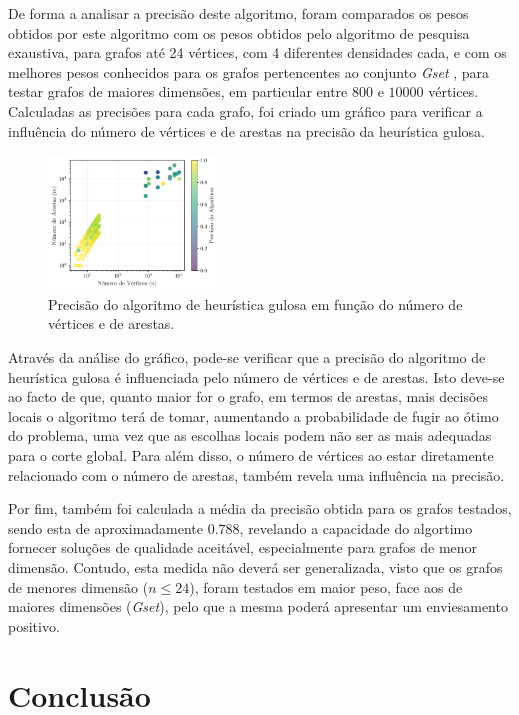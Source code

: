 \documentclass[mirror]{revdetua}
\begin{document}
De forma a analisar a precisão deste algoritmo, foram comparados os pesos obtidos por este algoritmo com os pesos obtidos pelo algoritmo de pesquisa exaustiva, para grafos até 24 vértices, com 4 diferentes densidades cada, e com os melhores pesos conhecidos para os grafos pertencentes ao conjunto \textit{Gset} \cite{GS24, ME19}, para testar grafos de maiores dimensões, em particular entre $800$ e $10000$ vértices. Calculadas as precisões para cada grafo, foi criado um gráfico para verificar a influência do número de vértices e de arestas na precisão da heurística gulosa.

\begin{figure}[h]
    \centering
    \includegraphics[width=0.4\textwidth]{../assets/precHEU.png}
    \caption{Precisão do algoritmo de heurística gulosa em função do número de vértices e de arestas.}
    \label{fig:precheu}
\end{figure}

Através da análise do gráfico, pode-se verificar que a precisão do algoritmo de heurística gulosa é influenciada pelo número de vértices e de arestas. Isto deve-se ao facto de que, quanto maior for o grafo, em termos de arestas, mais decisões locais o algoritmo terá de tomar, aumentando a probabilidade de fugir ao ótimo do problema, uma vez que as escolhas locais podem não ser as mais adequadas para o corte global. Para além disso, o número de vértices ao estar diretamente relacionado com o número de arestas, também revela uma influência na precisão.

Por fim, também foi calculada a média da precisão obtida para os grafos testados, sendo esta de aproximadamente $0.788$, revelando a capacidade do algortimo fornecer soluções de qualidade aceitável, especialmente para grafos de menor dimensão. Contudo, esta medida não deverá ser generalizada, visto que os grafos de menores dimensão ($n \leq 24$), foram testados em maior peso, face aos de maiores dimensões (\textit{Gset}), pelo que a mesma poderá apresentar um enviesamento positivo.

\section{Conclusão}
\end{document}
